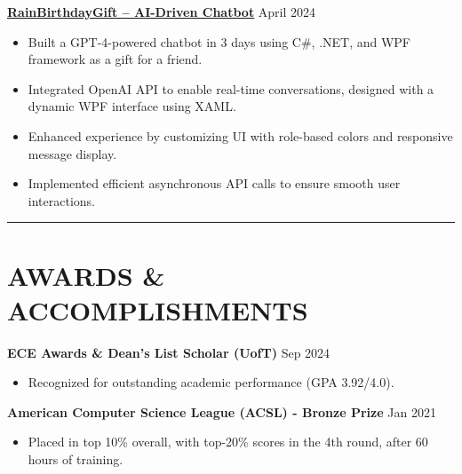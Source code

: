 \documentclass[a4paper,10pt]{article}
\begin{document}
\vspace{0.3cm}
\noindent\href{https://github.com/Ken-2511/RainBirthdayGift}{\uline{
\textbf{RainBirthdayGift – AI-Driven Chatbot}}} \hfill April 2024
\begin{itemize}[leftmargin=0.2in]
    \item Built a GPT-4-powered chatbot in 3 days using C\#, .NET, and WPF framework as a gift for a friend.
    \item Integrated OpenAI API to enable real-time conversations, designed with a dynamic WPF interface using XAML.
    \item Enhanced experience by customizing UI with role-based colors and responsive message display.
    \item Implemented efficient asynchronous API calls to ensure smooth user interactions.
\end{itemize}


\noindent\rule{\linewidth}{1pt}

\section*{\textbf{AWARDS \& ACCOMPLISHMENTS}}

\noindent\textbf{ECE Awards \& Dean's List Scholar (UofT)} \hfill Sep 2024
\begin{itemize}[leftmargin=0.2in]
    \item Recognized for outstanding academic performance (GPA 3.92/4.0).
\end{itemize}

\vspace{0.3cm}
\noindent\textbf{American Computer Science League (ACSL) - Bronze Prize} \hfill Jan 2021
\begin{itemize}[leftmargin=0.2in]
    \item Placed in top 10\% overall, with top-20\% scores in the 4th round, after 60 hours of training.
\end{itemize}
\end{document}
